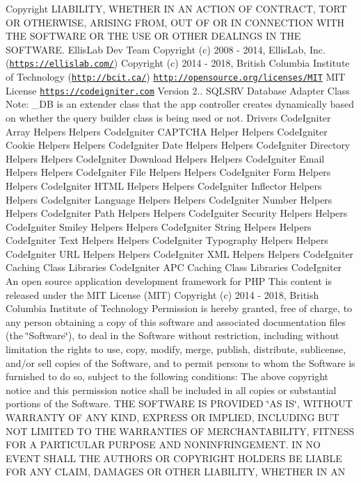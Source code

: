 \begin{DoxyCopyright}{Copyright}
L\+I\+A\+B\+I\+L\+I\+TY, W\+H\+E\+T\+H\+ER IN AN A\+C\+T\+I\+ON OF C\+O\+N\+T\+R\+A\+CT, T\+O\+RT OR O\+T\+H\+E\+R\+W\+I\+SE, A\+R\+I\+S\+I\+NG F\+R\+OM, O\+UT OF OR IN C\+O\+N\+N\+E\+C\+T\+I\+ON W\+I\+TH T\+HE S\+O\+F\+T\+W\+A\+RE OR T\+HE U\+SE OR O\+T\+H\+ER D\+E\+A\+L\+I\+N\+GS IN T\+HE S\+O\+F\+T\+W\+A\+RE.  Ellis\+Lab Dev Team  Copyright (c) 2008 -\/ 2014, Ellis\+Lab, Inc. (\href{https://ellislab.com/}{\tt https\+://ellislab.\+com/})  Copyright (c) 2014 -\/ 2018, British Columbia Institute of Technology (\href{http://bcit.ca/}{\tt http\+://bcit.\+ca/})  \href{http://opensource.org/licenses/MIT}{\tt http\+://opensource.\+org/licenses/\+M\+IT} M\+IT License  \href{https://codeigniter.com}{\tt https\+://codeigniter.\+com}  Version 2..  S\+Q\+L\+S\+RV Database Adapter Class Note\+: \+\_\+\+DB is an extender class that the app controller creates dynamically based on whether the query builder class is being used or not.  Drivers Code\+Igniter Array Helpers  Helpers Code\+Igniter C\+A\+P\+T\+C\+HA Helper  Helpers Code\+Igniter Cookie Helpers  Helpers Code\+Igniter Date Helpers  Helpers Code\+Igniter Directory Helpers  Helpers Code\+Igniter Download Helpers  Helpers Code\+Igniter Email Helpers  Helpers Code\+Igniter File Helpers  Helpers Code\+Igniter Form Helpers  Helpers Code\+Igniter H\+T\+ML Helpers  Helpers Code\+Igniter Inflector Helpers  Helpers Code\+Igniter Language Helpers  Helpers Code\+Igniter Number Helpers  Helpers Code\+Igniter Path Helpers  Helpers Code\+Igniter Security Helpers  Helpers Code\+Igniter Smiley Helpers  Helpers Code\+Igniter String Helpers  Helpers Code\+Igniter Text Helpers  Helpers Code\+Igniter Typography Helpers  Helpers Code\+Igniter U\+RL Helpers  Helpers Code\+Igniter X\+ML Helpers  Helpers Code\+Igniter Caching Class  Libraries Code\+Igniter A\+PC Caching Class  Libraries Code\+Igniter An open source application development framework for P\+HP This content is released under the M\+IT License (M\+IT) Copyright (c) 2014 -\/ 2018, British Columbia Institute of Technology Permission is hereby granted, free of charge, to any person obtaining a copy of this software and associated documentation files (the \char`\"{}\+Software\char`\"{}), to deal in the Software without restriction, including without limitation the rights to use, copy, modify, merge, publish, distribute, sublicense, and/or sell copies of the Software, and to permit persons to whom the Software is furnished to do so, subject to the following conditions\+: The above copyright notice and this permission notice shall be included in all copies or substantial portions of the Software. T\+HE S\+O\+F\+T\+W\+A\+RE IS P\+R\+O\+V\+I\+D\+ED \char`\"{}\+A\+S I\+S\char`\"{}, W\+I\+T\+H\+O\+UT W\+A\+R\+R\+A\+N\+TY OF A\+NY K\+I\+ND, E\+X\+P\+R\+E\+SS OR I\+M\+P\+L\+I\+ED, I\+N\+C\+L\+U\+D\+I\+NG B\+UT N\+OT L\+I\+M\+I\+T\+ED TO T\+HE W\+A\+R\+R\+A\+N\+T\+I\+ES OF M\+E\+R\+C\+H\+A\+N\+T\+A\+B\+I\+L\+I\+TY, F\+I\+T\+N\+E\+SS F\+OR A P\+A\+R\+T\+I\+C\+U\+L\+AR P\+U\+R\+P\+O\+SE A\+ND N\+O\+N\+I\+N\+F\+R\+I\+N\+G\+E\+M\+E\+NT. IN NO E\+V\+E\+NT S\+H\+A\+LL T\+HE A\+U\+T\+H\+O\+RS OR C\+O\+P\+Y\+R\+I\+G\+HT H\+O\+L\+D\+E\+RS BE L\+I\+A\+B\+LE F\+OR A\+NY C\+L\+A\+IM, D\+A\+M\+A\+G\+ES OR O\+T\+H\+ER L\+I\+A\+B\+I\+L\+I\+TY, W\+H\+E\+T\+H\+ER IN AN 
\end{DoxyCopyright}
